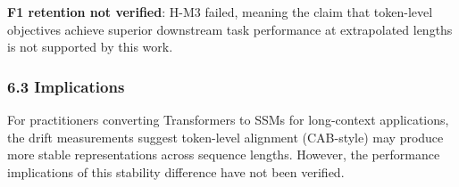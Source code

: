 \textbf{F1 retention not verified}: H-M3 failed, meaning the claim that token-level objectives achieve superior downstream task performance at extrapolated lengths is not supported by this work.

\subsubsection{6.3 Implications}

For practitioners converting Transformers to SSMs for long-context applications, the drift measurements suggest token-level alignment (CAB-style) may produce more stable representations across sequence lengths. However, the performance implications of this stability difference have not been verified.


